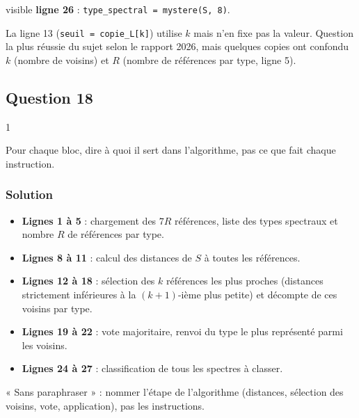 \documentclass[11pt,a4paper]{article}
\providecommand{\tightlist}{\setlength{\itemsep}{0pt}\setlength{\parskip}{0pt}}
\begin{document}
visible \textbf{ligne 26} : \texttt{type\_spectral\ =\allowbreak{}\ mystere(\allowbreak{}S,\allowbreak{}\ 8)\allowbreak{}}.

\begin{piege}

La ligne 13 (\texttt{seuil\ =\allowbreak{}\ copie\_L{[}k{]}\allowbreak{}}) utilise \(k\) mais n'en fixe pas la valeur. Question la plus réussie du sujet selon le rapport 2026, mais quelques copies ont confondu \(k\) (nombre de voisins) et \(R\) (nombre de références par type, ligne 5).

\end{piege}

\hypertarget{question-18}{%
\subsection{Question 18}\label{question-18}}

\begin{indication}{1}

Pour chaque bloc, dire à quoi il sert dans l'algorithme, pas ce que fait chaque instruction.

\end{indication}

\hypertarget{solution-17}{%
\subsubsection{Solution}\label{solution-17}}

\begin{itemize}
\tightlist
\item
  \textbf{Lignes 1 à 5} : chargement des \(7R\) références, liste des types spectraux et nombre \(R\) de références par type.
\item
  \textbf{Lignes 8 à 11} : calcul des distances de \(S\) à toutes les références.
\item
  \textbf{Lignes 12 à 18} : sélection des \(k\) références les plus proches (distances strictement inférieures à la \((k+1)\)-ième plus petite) et décompte de ces voisins par type.
\item
  \textbf{Lignes 19 à 22} : vote majoritaire, renvoi du type le plus représenté parmi les voisins.
\item
  \textbf{Lignes 24 à 27} : classification de tous les spectres à classer.
\end{itemize}

\begin{methode}

« Sans paraphraser » : nommer l'étape de l'algorithme (distances, sélection des voisins, vote, application), pas les instructions.

\end{methode}
\end{document}

